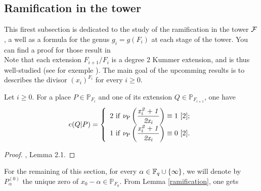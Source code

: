 \documentclass[10pt]{article}
\begin{document}
\s

\subsection{Ramification in the tower}

\s

This firest subsection is dedicated to the study of the ramification in the tower $\mathcal{F}$, a well as a formula for the genus $g_i = g(F_i)$ at each stage of the tower. You can find a proof for those result in \cite{NOQ} \\
Note that each extension $F_{i+1}/F_{i}$ is a degree 2 Kummer extension, and is thus well-studied (see for exemple \cite{Sti}). The main goal of the upcomming results is to describes the divisor $(x_i)^{F_i}$ for every $i \geq 0$.

\s

\begin{lemma} \label{ramification}
Let $i \geq 0$. For a place $P \in \mathbb{P}_{F_i}$ and one of its extension $Q \in \mathbb{P}_{F_{i+1}}$, one have 
\begin{equation*}
e(Q|P) = \left\{ \begin{array}{ll}
2 \ \rm if \  \nu_P\left(\it \dfrac{x_i^2+1}{2x_i}\right) \rm \equiv 1 \ [2] ;\\
1 \ \rm if \  \nu_P\left(\it \dfrac{x_i^2+1}{2x_i}\right) \rm \equiv 0  \ [2]. 
\end{array}
\right.
\end{equation*}
\end{lemma}

\s

\begin{proof}
\cite{NOQ}, Lemma 2.1.
\end{proof}

\s

For the remaining of this section, for every $\alpha \in \mathbb{F}_q \cup \{\infty\}$, we will denote by $P_{\alpha}^{(0)}$ the unique zero of $x_0-\alpha \in \mathbb{P}_{F_0}$. From Lemma \ref{ramification}, one gets

\s
\end{document}
